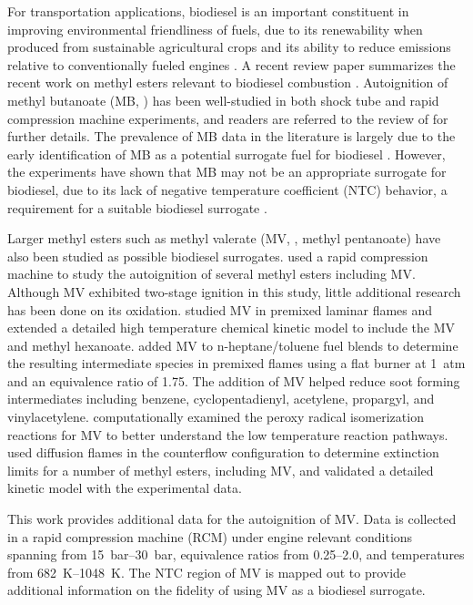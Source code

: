 \documentclass[12pt]{../ussci}
\begin{document}
For transportation applications, biodiesel is an important constituent in
improving environmental friendliness of fuels, due to its renewability when
produced from sustainable agricultural crops and its ability to reduce emissions
relative to conventionally fueled engines \autocite{Hoekman2012}. A recent
review paper summarizes the recent work on methyl esters relevant to biodiesel
combustion \autocite{Coniglio2013}. Autoignition of methyl butanoate (MB,
) has been well-studied in both shock tube and rapid compression
machine experiments, and readers are referred to the review of
\textcite{Coniglio2013} for further details. The prevalence of MB data in the
literature is largely due to the early identification of MB as a potential
surrogate fuel for biodiesel \autocite{Fisher2000}. However, the experiments
have shown that MB may not be an appropriate surrogate for biodiesel, due to its
lack of negative temperature coefficient (NTC) behavior, a requirement for a
suitable biodiesel surrogate \autocite{Coniglio2013}.

Larger methyl esters such as methyl valerate (MV, , methyl
pentanoate) have also been studied as possible biodiesel surrogates.
\textcite{Hadj-Ali2009} used a rapid compression machine to study the
autoignition of several methyl esters including MV. Although MV exhibited
two-stage ignition in this study, little additional research has been done on
its oxidation. \textcite{Korobeinichev2015} studied MV in premixed laminar
flames and extended a detailed high temperature chemical kinetic model to
include the MV and methyl hexanoate. \textcite{Dmitriev2015} added MV to
n-heptane/toluene fuel blends to determine the resulting intermediate species in
premixed flames using a flat burner at \SI{1}{atm} and an equivalence ratio of
1.75. The addition of MV helped reduce soot forming intermediates including
benzene, cyclopentadienyl, acetylene, propargyl, and vinylacetylene.
\textcite{Hayes2009} computationally examined the peroxy radical isomerization
reactions for MV to better understand the low temperature reaction pathways.
\textcite{Dievart2013} used diffusion flames in the counterflow configuration to
determine extinction limits for a number of methyl esters, including MV, and
validated a detailed kinetic model with the experimental data.

This work provides additional data for the autoignition of MV. Data is collected
in a rapid compression machine (RCM) under engine relevant conditions spanning
from \SIrange{15}{30}{\bar}, equivalence ratios from \numrange{0.25}{2.0}, and
temperatures from \SIrange{682}{1048}{\K}. The NTC region of MV is mapped out to
provide additional information on the fidelity of using MV as a biodiesel
surrogate.
\end{document}
